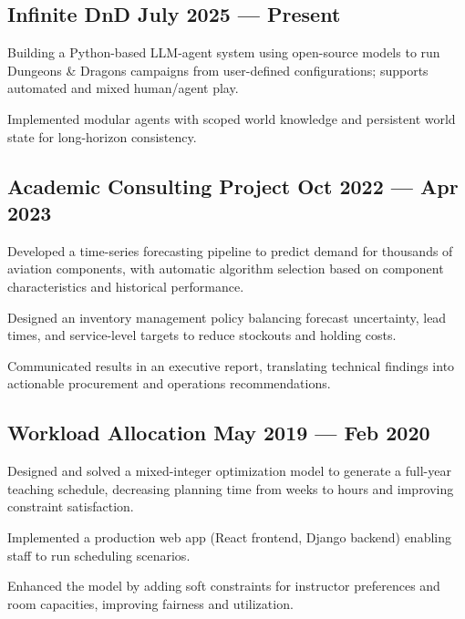 \subsection{{Infinite DnD \hfill July 2025 --- Present}}
\begin{zitemize}
    \setlength\itemsep{0.4em}
    \item Building a Python-based LLM-agent system using open-source models to run Dungeons \& Dragons campaigns from user-defined configurations; supports automated and mixed human/agent play.
    \item Implemented modular agents with scoped world knowledge and persistent world state for long-horizon consistency.
\end{zitemize}
\vspace{0.75em}

\subsection{{Academic Consulting Project \hfill Oct 2022 --- Apr 2023}}
\begin{zitemize}
    \setlength\itemsep{0.4em}
    \item Developed a time-series forecasting pipeline to predict demand for thousands of aviation components, with automatic algorithm selection based on component characteristics and historical performance.
    \item Designed an inventory management policy balancing forecast uncertainty, lead times, and service-level targets to reduce stockouts and holding costs.
    \item Communicated results in an executive report, translating technical findings into actionable procurement and operations recommendations.
\end{zitemize}
\vspace{0.75em}

\subsection{{Workload Allocation \hfill May 2019 --- Feb 2020}}
\begin{zitemize}
    \setlength\itemsep{0.4em}
    \item Designed and solved a mixed-integer optimization model to generate a full-year teaching schedule, decreasing planning time from weeks to hours and improving constraint satisfaction.
    \item Implemented a production web app (React frontend, Django backend) enabling staff to run scheduling scenarios.
    \item Enhanced the model by adding soft constraints for instructor preferences and room capacities, improving fairness and utilization.
\end{zitemize}